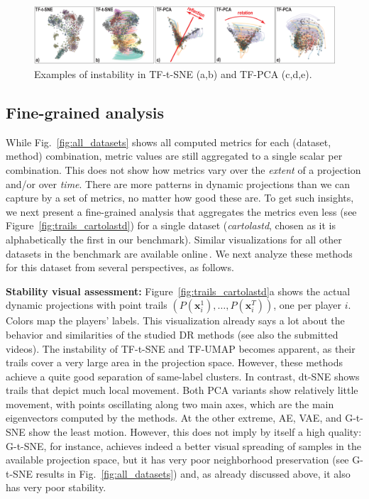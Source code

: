 \begin{figure}[tb]\centering
  \includegraphics[width=0.75\linewidth]{figures/projection-evaluation/instability.eps}
  \caption{Examples of instability in TF-t-SNE (a,b) and TF-PCA (c,d,e).}
  \vspace{-0.15cm}
  \label{fig:instability}
\end{figure}


\subsection{Fine-grained analysis}
%
While Fig.~\ref{fig:all_datasets} shows all computed metrics for each (dataset, method) combination, metric values are still aggregated to a single scalar per combination. This does not show how metrics vary over the \emph{extent} of a projection and/or over \emph{time}. There are more patterns in dynamic projections than we can capture by a set of metrics, no matter how good these are. To get such insights, we next present a fine-grained analysis that aggregates the metrics even less (see Figure~\ref{fig:trails_cartolastd}) for a single dataset (\emph{cartolastd}, chosen as it is alphabetically the first in our benchmark).
Similar visualizations for all other datasets in the benchmark are available online\,\cite{repo}. We next analyze these methods for this dataset from several perspectives, as follows.

\noindent\textbf{Stability visual assessment:} Figure~\ref{fig:trails_cartolastd}a shows the actual dynamic projections with point trails $(P(\mathbf{x}_i^1),\ldots, P(\mathbf{x}_i^T))$, one per player $i$. Colors map the players' labels. This visualization already says a lot about the behavior and similarities of the studied DR methods (see also the submitted videos). The instability of TF-t-SNE and TF-UMAP becomes apparent, as their trails cover a very large area in the projection space. However, these methods achieve a quite good separation of same-label clusters. In contrast, dt-SNE shows trails that depict much local movement. Both PCA variants show relatively little movement, with points oscillating along two main axes, which are the main eigenvectors computed by the methods. At the other extreme, AE, VAE, and G-t-SNE show the least motion. However, this does not imply by itself a high quality: G-t-SNE, for instance, achieves indeed a better visual spreading of samples in the available projection space, but it has very poor neighborhood preservation (see G-t-SNE results in Fig.~\ref{fig:all_datasets}) and, as already discussed above, it also has very poor stability.

